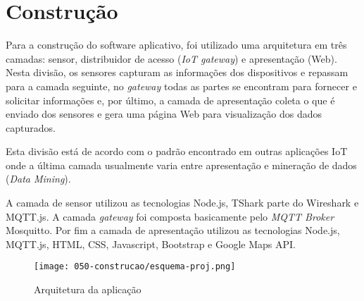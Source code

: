\chapter{Construção}
\label{chap:Construcao}

Para a construção do software aplicativo, foi utilizado uma arquitetura em
três camadas: sensor, distribuidor de acesso (\emph{IoT gateway}) e apresentação
(Web). Nesta divisão, os sensores capturam as informações dos dispositivos
e repassam para a camada seguinte, no \emph{gateway} todas as partes se
encontram para fornecer e solicitar informações e, por último, a camada de
apresentação coleta o que é enviado dos sensores e gera uma página Web
para visualização dos dados capturados.

Esta divisão está de acordo com o padrão encontrado em outras aplicações
IoT onde a última camada usualmente varia entre apresentação e mineração
de dados (\emph{Data Mining}).

A camada de sensor utilizou as tecnologias Node.js, TShark parte
do Wireshark e MQTT.js. A camada \emph{gateway} foi composta
basicamente pelo \emph{MQTT Broker} Mosquitto. Por fim a camada de
apresentação utilizou as tecnologias Node.js, MQTT.js, HTML,
CSS, Javascript, Bootstrap e Google Maps API.

\begin{figure}[htb]
	\caption{\label{fig-arq-app}Arquitetura da aplicação}
	\begin{center}
		\texttt{[image: 050-construcao/esquema-proj.png]}
	\end{center}
\end{figure}
